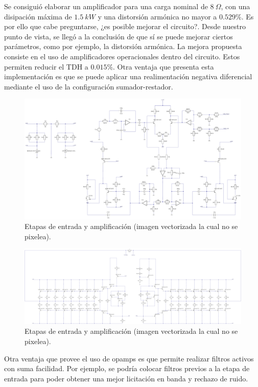 Se consiguió elaborar un amplificador para una carga nominal de $8 \ \Omega$, con una disipación máxima de $1.5 \ kW$ y una distorsión armónica no mayor a $0.529\%$. Es por ello que cabe preguntarse, ¿es posible mejorar el circuito?. Desde nuestro punto de vista, se llegó a la conclusión de que sí se puede mejorar ciertos parámetros, como por ejemplo, la distorsión armónica. La mejora propuesta consiste en el uso de amplificadores operacionales dentro del circuito. Estos permiten reducir el TDH a $0.015 \%$. Otra ventaja que presenta esta implementación es que se puede aplicar una realimentación negativa diferencial mediante el uso de la configuración sumador-restador.

\begin{figure}[H]
\centering
	\includegraphics[width=\textwidth]{./ImagenesConclusiones/VOPTEX1.pdf}
	\caption{Etapas de entrada y amplificación (imagen vectorizada la cual no se pixelea).}	
\end{figure}
\begin{figure}[H]
\centering
	\includegraphics[width=\textwidth]{./ImagenesConclusiones/VOPTEX2.pdf}
	\caption{Etapas de entrada y amplificación (imagen vectorizada la cual no se pixelea).}
\end{figure}

Otra ventaja que provee el uso de opamps es que permite realizar filtros activos con suma facilidad. Por ejemplo, se podría colocar filtros previos a la etapa de entrada para poder obtener una mejor licitación en banda y rechazo de ruido.

